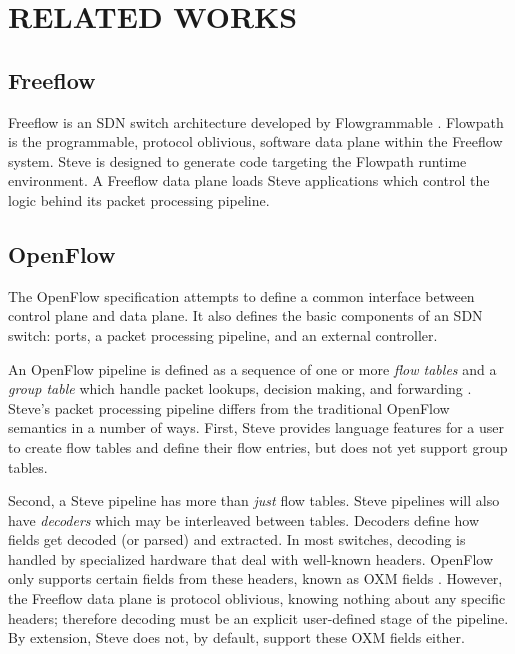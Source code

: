 \chapter{RELATED WORKS} \label{ch:related}

\section{Freeflow} \label{rel:freeflow}

Freeflow is an SDN switch architecture developed
by Flowgrammable \cite{freeflow_software}. Flowpath is the programmable, protocol oblivious, software data plane within the Freeflow system. Steve is
designed to generate code targeting the Flowpath runtime environment. A Freeflow data plane loads Steve applications which control the logic behind its packet processing pipeline.

\section{OpenFlow} \label{rel:openflow}

The OpenFlow specification \cite{openflow_spec} attempts to define a common interface between control plane and data plane. It also defines the basic components of an SDN switch: ports, a packet processing pipeline, and an external controller.

An OpenFlow pipeline is defined as a sequence
of one or more \textit{flow tables} and a \textit{group table} which handle
packet lookups, decision making, and forwarding \cite{openflow_spec}. Steve's packet processing pipeline differs from the traditional OpenFlow
semantics in a number of ways. First,
Steve provides language features for a user to create flow tables and define
their flow entries, but does not yet support group tables. 

Second, a Steve pipeline has more than \textit{just} flow tables. Steve
pipelines will also have \textit{decoders} which may be interleaved between
tables. Decoders define how fields get decoded (or parsed) and extracted. In
most switches, decoding is handled by specialized hardware that deal with
well-known headers. OpenFlow only supports certain fields from these headers,
known as OXM fields \cite{openflow_spec}. However, the Freeflow data plane is
protocol oblivious, knowing nothing about any specific headers; therefore
decoding must be an explicit user-defined stage of the pipeline. By extension,
Steve does not, by default, support these OXM fields either.

